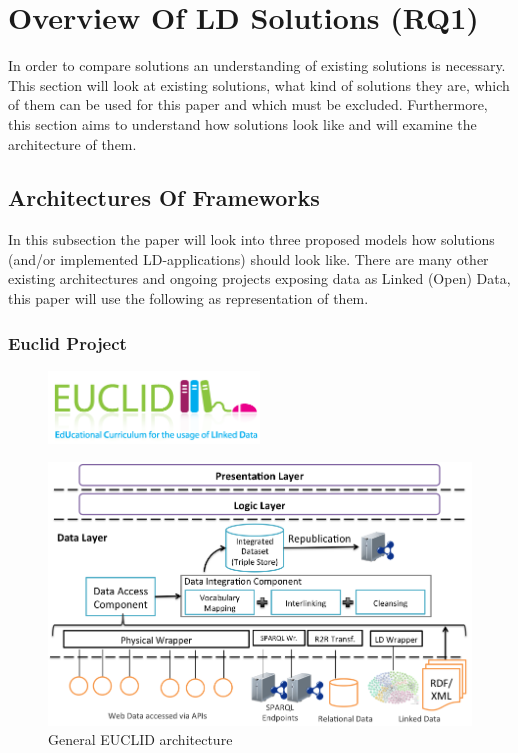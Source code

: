 \chapter{Overview Of LD Solutions (RQ1)}\label{overview}
In order to compare solutions an understanding of existing solutions is necessary. This section will look at existing solutions, what kind of solutions they are, which of them can be used for this paper and which must be excluded. Furthermore, this section aims to understand how solutions look like and will examine the architecture of them.

\section{Architectures Of Frameworks}\label{arch_frameworks}
In this subsection the paper will look into three proposed models how solutions (and/or implemented LD-applications) should look like. There are many other existing architectures and ongoing projects exposing data as Linked (Open) Data, this paper will use the following as representation of them.

\subsection{Euclid Project}

\begin{figure}[h]
	\centering
\includegraphics[width=0.5\textwidth]{img/euclid_logo.png}
\end{figure}

\begin{figure}[htbp]
	\centering
\includegraphics[width=.8\textwidth]{img/euclid_architecture.png}
	\caption{General EUCLID architecture}
	\label{euclid_architecture}
\end{figure}

